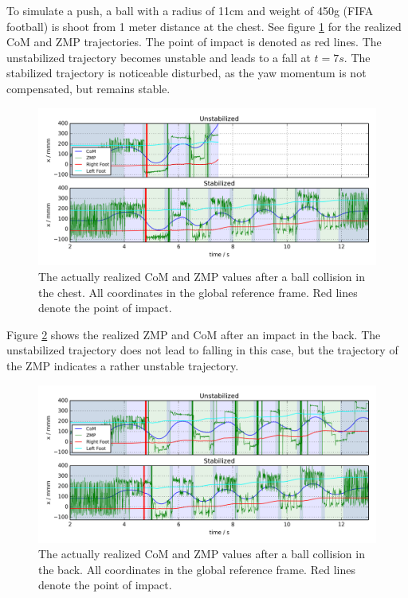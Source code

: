 \documentclass[english,ngerman]{KITreprt}
\begin{document}
To simulate a push, a ball with a radius of 11cm and weight of 450g
(FIFA football) is shoot from 1 meter distance at the chest. See figure
\ref{img:disturbed-front-straight-x} for the realized CoM and ZMP
trajectories. The point of impact is denoted as red lines. The
unstabilized trajectory becomes unstable and leads to a fall at
$t = 7s$. The stabilized trajectory is noticeable disturbed, as the yaw
momentum is not compensated, but remains stable.

\begin{figure}[hbt]
\vspace*{-1em}
\includegraphics[width=\textwidth,resolution=300]{images/disturbed_front_straight_x.png}
\caption{The actually realized CoM and ZMP values after a ball collision in the chest.
All coordinates in the global reference frame. Red lines denote the point of impact.}
\label{img:disturbed-front-straight-x}
\end{figure}

Figure \ref{img:disturbed-back-straight-x} shows the realized ZMP and
CoM after an impact in the back. The unstabilized trajectory does not
lead to falling in this case, but the trajectory of the ZMP indicates a
rather unstable trajectory.

\begin{figure}[hbt]
\vspace*{-1em}
\includegraphics[width=\textwidth,resolution=300]{images/disturbed_back_straight_x.png}
\caption{The actually realized CoM and ZMP values after a ball collision in the back.
All coordinates in the global reference frame. Red lines denote the point of impact.}
\label{img:disturbed-back-straight-x}
\end{figure}
\end{document}
